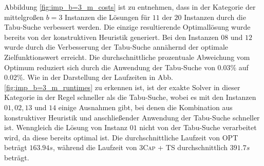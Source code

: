 Abbildung \ref{fig:imp_b=3_m_costs} ist zu entnehmen, dass in der Kategorie der mittelgroßen $b = 3$ Instanzen
die Lösungen für $11$ der $20$ Instanzen durch die Tabu-Suche verbessert werden.
Die einzige resultierende Optimallösung wurde bereits von der konstruktiven Heuristik generiert.
Bei den Instanzen $08$ und $12$ wurde durch die Verbesserung der Tabu-Suche annähernd der optimale
Zielfunktionswert erreicht. Die durchschnittliche prozentuale Abweichung vom Optimum reduziert sich
durch die Anwendung der Tabu-Suche von $0.03 \%$ auf $0.02 \%$.
Wie in der Darstellung der Laufzeiten in Abb. \ref{fig:imp_b=3_m_runtimes} zu erkennen ist,
ist der exakte Solver in dieser Kategorie in der Regel schneller als die Tabu-Suche, wobei es mit
den Instanzen $01, 02, 13$ und $14$ einige Ausnahmen gibt, bei denen die Kombination aus konstruktiver Heuristik
und anschließender Anwendung der Tabu-Suche schneller ist. Wenngleich die Lösung von Instanz $01$ nicht von der
Tabu-Suche verarbeitet wird, da diese bereits optimal ist. Die durchschnittliche Laufzeit von \textsc{OPT}
beträgt $163.94s$, während die Laufzeit von \textsc{3Cap + TS} durchschnittlich $391.7s$ beträgt.

\vfill
\pagebreak

